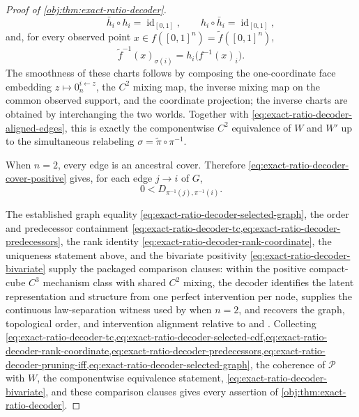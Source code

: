 \begin{proof}[Proof of \cref{obj:thm:exact-ratio-decoder}]
\[\qquad
\bar h_i\circ h_i=\operatorname{id}_{[0,1]},
\qquad
h_i\circ\bar h_i=\operatorname{id}_{[0,1]},
\]
and, for every observed point \(x\in f([0,1]^n)=\widetilde f([0,1]^n)\),
\begin{equation}
\widetilde f^{-1}(x)_{\sigma(i)}=h_i\bigl(f^{-1}(x)_i\bigr).
\label{eq:exact-ratio-decoder-componentwise-assembly-target}
\end{equation}
The smoothness of these charts follows by composing the one-coordinate face embedding \(z\mapsto 0_n^{i\leftarrow z}\), the \(C^2\) mixing map, the inverse mixing map on the common observed support, and the coordinate projection; the inverse charts are obtained by interchanging the two worlds. Together with \cref{eq:exact-ratio-decoder-aligned-edges}, this is exactly the componentwise \(C^2\) equivalence of \(W\) and \(W'\) up to the simultaneous relabeling \(\sigma=\widetilde\pi\circ\pi^{-1}\). %

When \(n=2\), every edge is an ancestral cover. Therefore \cref{eq:exact-ratio-decoder-cover-positive} gives, for each edge \(j\to i\) of \(G\),
\begin{equation}
0<D_{\pi^{-1}(j),\pi^{-1}(i)}.
\label{eq:exact-ratio-decoder-bivariate}
\end{equation}

The established graph equality \cref{eq:exact-ratio-decoder-selected-graph}, the order and predecessor containment \cref{eq:exact-ratio-decoder-tc,eq:exact-ratio-decoder-predecessors}, the rank identity \cref{eq:exact-ratio-decoder-rank-coordinate}, the uniqueness statement above, and the bivariate positivity \cref{eq:exact-ratio-decoder-bivariate} supply the packaged comparison clauses: within the positive compact-cube \(C^3\) mechanism class with shared \(C^2\) mixing, the decoder identifies the latent representation and structure from one perfect intervention per node, supplies the continuous law-separation witness used by \citet[Theorem~3.2]{vonKugelgenEtAl2023UnknownInterventions} when \(n=2\), and recovers the graph, topological order, and intervention alignment relative to \citet[Theorem~4.2]{WendongEtAl2023CauCA} and \citet[Corollary~{D}.1]{YaoEtAl2025InvariancePrinciple}. Collecting \cref{eq:exact-ratio-decoder-tc,eq:exact-ratio-decoder-selected-cdf,eq:exact-ratio-decoder-rank-coordinate,eq:exact-ratio-decoder-predecessors,eq:exact-ratio-decoder-pruning-iff,eq:exact-ratio-decoder-selected-graph}, the coherence of \(\mathcal P\) with \(W\), the componentwise equivalence statement, \cref{eq:exact-ratio-decoder-bivariate}, and these comparison clauses gives every assertion of \cref{obj:thm:exact-ratio-decoder}. %
\end{proof}

